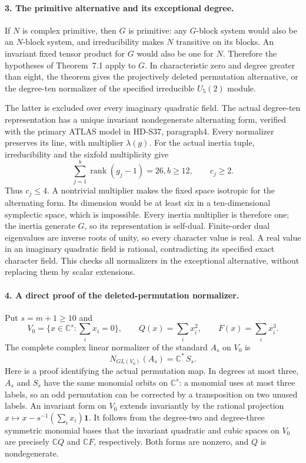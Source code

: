 \paragraph{3. The primitive alternative and its exceptional degree.}
If \(N\) is complex primitive, then \(G\) is primitive:
any \(G\)-block system would also be an \(N\)-block
system, and irreducibility makes \(N\) transitive on its
blocks. An invariant fixed tensor product for \(G\) would
also be one for \(N\). Therefore the hypotheses of
Theorem~7.1 apply to \(G\). In characteristic zero and
degree greater than eight, the theorem gives the projectively
deleted permutation alternative, or the degree-ten normalizer
of the specified irreducible \(U_5(2)\) module.

The latter is excluded over every imaginary quadratic field.
The actual degree-ten representation has a unique invariant
nondegenerate alternating form, verified with the primary
ATLAS model in HD-S37, paragraph4. Every normalizer preserves
its line, with multiplier \(\lambda(g)\). For the actual
inertia tuple, irreducibility and the sixfold multiplicity give
\[
       \sum_{j=1}^b\operatorname{rank}(g_j-1)=26,
                   b\ge12,\qquad c_j\ge2.                 \tag{S41.5}
\]
Thus \(c_j\le4\). A nontrivial multiplier makes the fixed
space isotropic for the alternating form. Its dimension would
be at least six in a ten-dimensional symplectic space, which
is impossible. Every inertia multiplier is therefore one;
the inertia generate \(G\), so its representation is
self-dual. Finite-order dual eigenvalues are inverse roots of
unity, so every character value is real. A real value in an
imaginary quadratic field is rational, contradicting its
specified exact character field. This checks all normalizers
in the exceptional alternative, without replacing them by
scalar extensions.

\paragraph{4. A direct proof of the deleted-permutation normalizer.}
Put \(s=m+1\ge10\) and
\[
       V_0=\{x\in\mathbb C^s:\sum_i x_i=0\},\qquad
       Q(x)=\sum_i x_i^2,\qquad F(x)=\sum_i x_i^3.          \tag{S41.6}
\]
The complete complex linear normalizer of the standard
\(A_s\) on \(V_0\) is
\[
          N_{GL(V_0)}(A_s)=\mathbb C^*\,S_s.               \tag{S41.7}
\]
Here is a proof identifying the actual permutation map.
In degrees at most three, \(A_s\) and \(S_s\) have the
same monomial orbits on \(\mathbb C^s\): a monomial uses
at most three labels, so an odd permutation can be corrected
by a transposition on two unused labels. An invariant form on
\(V_0\) extends invariantly by the rational projection
\(x\mapsto x-s^{-1}(\sum_i x_i)\boldsymbol1\).
It follows from the degree-two and degree-three symmetric
monomial bases that the invariant quadratic and cubic spaces
on \(V_0\) are precisely \(\mathbb C Q\) and
\(\mathbb C F\), respectively. Both forms are nonzero,
and \(Q\) is nondegenerate.

